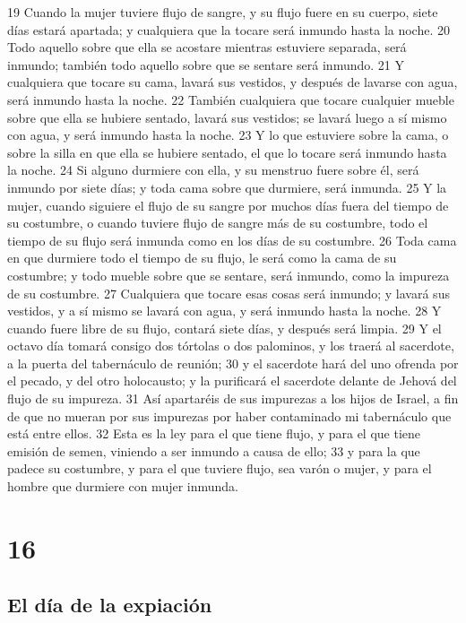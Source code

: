 19 Cuando la mujer tuviere flujo de sangre, y su flujo fuere en su cuerpo, siete días estará apartada; y cualquiera que la tocare será inmundo hasta la noche.
20 Todo aquello sobre que ella se acostare mientras estuviere separada, será inmundo; también todo aquello sobre que se sentare será inmundo.
21 Y cualquiera que tocare su cama, lavará sus vestidos, y después de lavarse con agua, será inmundo hasta la noche.
22 También cualquiera que tocare cualquier mueble sobre que ella se hubiere sentado, lavará sus vestidos; se lavará luego a sí mismo con agua, y será inmundo hasta la noche.
23 Y lo que estuviere sobre la cama, o sobre la silla en que ella se hubiere sentado, el que lo tocare será inmundo hasta la noche.
24 Si alguno durmiere con ella, y su menstruo fuere sobre él, será inmundo por siete días; y toda cama sobre que durmiere, será inmunda.
25 Y la mujer, cuando siguiere el flujo de su sangre por muchos días fuera del tiempo de su costumbre, o cuando tuviere flujo de sangre más de su costumbre, todo el tiempo de su flujo será inmunda como en los días de su costumbre.
26 Toda cama en que durmiere todo el tiempo de su flujo, le será como la cama de su costumbre; y todo mueble sobre que se sentare, será inmundo, como la impureza de su costumbre.
27 Cualquiera que tocare esas cosas será inmundo; y lavará sus vestidos, y a sí mismo se lavará con agua, y será inmundo hasta la noche.
28 Y cuando fuere libre de su flujo, contará siete días, y después será limpia.
29 Y el octavo día tomará consigo dos tórtolas o dos palominos, y los traerá al sacerdote, a la puerta del tabernáculo de reunión;
30 y el sacerdote hará del uno ofrenda por el pecado, y del otro holocausto; y la purificará el sacerdote delante de Jehová del flujo de su impureza.
31 Así apartaréis de sus impurezas a los hijos de Israel, a fin de que no mueran por sus impurezas por haber contaminado mi tabernáculo que está entre ellos.
32 Esta es la ley para el que tiene flujo, y para el que tiene emisión de semen, viniendo a ser inmundo a causa de ello;
33 y para la que padece su costumbre, y para el que tuviere flujo, sea varón o mujer, y para el hombre que durmiere con mujer inmunda.  

\chapter{16}

\section{El día de la expiación}

